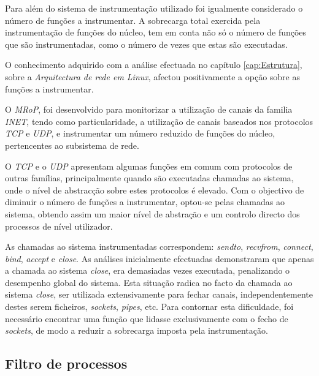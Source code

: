 Para além do sistema de instrumentação utilizado foi igualmente considerado o número de funções a instrumentar.
A sobrecarga total exercida pela instrumentação de funções do núcleo, tem em conta não só o número de funções que são instrumentadas, como o número de vezes que estas são executadas.

O conhecimento adquirido com a análise efectuada no capítulo \ref{cap:Estrutura}, sobre a \textit{Arquitectura de rede em Linux}, afectou positivamente a opção sobre as funções a instrumentar.

O \textit{MRoP}, foi desenvolvido para monitorizar a utilização de canais da familia \textit{INET}, tendo como particularidade, a utilização de canais baseados nos protocolos \textit{TCP} e \textit{UDP}, e instrumentar um número reduzido de funções do núcleo, pertencentes ao subsistema de rede.

O \textit{TCP} e o \textit{UDP} apresentam algumas funções em comum com protocolos de outras famílias, principalmente quando são executadas chamadas ao sistema, onde o nível de abstracção sobre estes protocolos é elevado.
Com o objectivo de diminuir o número de funções a instrumentar, optou-se pelas chamadas ao sistema, obtendo assim um maior nível de abstração e um controlo directo dos processos de nível utilizador.

As chamadas ao sistema instrumentadas correspondem: \textit{sendto}, \textit{recvfrom}, \textit{connect}, \textit{bind}, \textit{accept} e \textit{close}.
As análises inicialmente efectuadas demonstraram que apenas a chamada ao sistema \textit{close}, era demasiadas vezes executada, penalizando o desempenho global do sistema.
Esta situação radica no facto da chamada ao sistema \textit{close}, ser utilizada extensivamente para fechar canais, independentemente destes serem ficheiros, \textit{sockets}, \textit{pipes}, etc.
Para contornar esta dificuldade, foi necessário encontrar uma função que lidasse exclusivamente com o fecho de \textit{sockets}, de modo a reduzir a sobrecarga imposta pela instrumentação.


\subsection{Filtro de processos}



